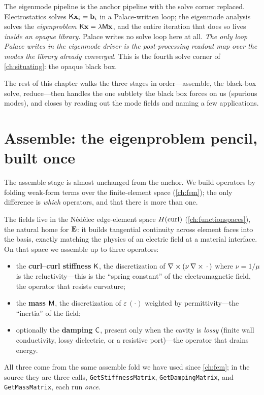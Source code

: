 \begin{keyidea}
The eigenmode pipeline is the anchor pipeline with the solve corner replaced.
Electrostatics solves $\mathsf{K}\mathbf{x}_i=\mathbf{b}_i$ in a Palace-written loop; the eigenmode
analysis solves the \emph{eigenproblem} $\mathsf{K}\mathbf{x}=\lambda\mathsf{M}\mathbf{x}$, and the entire
iteration that does so lives \emph{inside an opaque library}. Palace writes no
solve loop here at all. \emph{The only loop Palace writes in the eigenmode driver
is the post-processing readout map over the modes the library already
converged.} This is the fourth solve corner of \cref{ch:situating}: the opaque
black box.
\end{keyidea}

The rest of this chapter walks the three stages in order---assemble, the
black-box solve, reduce---then handles the one subtlety the black box forces on
us (spurious modes), and closes by reading out the mode fields and naming a few
applications.

\section{Assemble: the eigenproblem pencil, built once}
\label{sec:eig-assemble}

The assemble stage is almost unchanged from the anchor. We build operators by
folding weak-form terms over the finite-element space (\cref{ch:fem}); the only
difference is \emph{which} operators, and that there is more than one.

The fields live in the Nédélec edge-element space $H(\mathrm{curl})$ (\cref{ch:functionspaces}),
the natural home for $\mathbf{E}$: it builds tangential continuity across element faces
into the basis, exactly matching the physics of an electric field at a material
interface. On that space we assemble up to three operators:
\begin{itemize}[nosep]
  \item the \textbf{curl--curl stiffness} $\mathsf{K}$, the discretization of
  $\nabla\times(\nu\,\nabla\times\,\cdot\,)$ where $\nu=1/\mu$ is the reluctivity---this is the
  ``spring constant'' of the electromagnetic field, the operator that resists
  curvature;
  \item the \textbf{mass} $\mathsf{M}$, the discretization of $\varepsilon\,(\cdot)$
  weighted by permittivity---the ``inertia'' of the field;
  \item optionally the \textbf{damping} $\mathsf{C}$, present only when the cavity is
  \emph{lossy} (finite wall conductivity, lossy dielectric, or a resistive
  port)---the operator that drains energy.
\end{itemize}
All three come from the same assemble fold we have used since \cref{ch:fem}; in
the source they are three calls,
\lstinline[style=l4style]|GetStiffnessMatrix|,
\lstinline[style=l4style]|GetDampingMatrix|, and
\lstinline[style=l4style]|GetMassMatrix|, each run \emph{once}.


